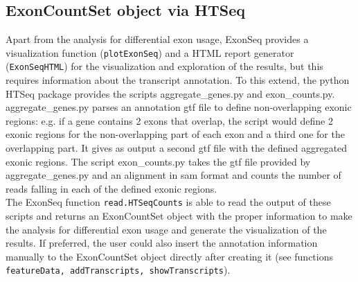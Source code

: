 \documentclass{article}
\begin{document}
\subsection{ExonCountSet object via HTSeq}
Apart from the analysis for differential exon usage, ExonSeq provides a visualization function (\texttt{plotExonSeq}) and a HTML report generator (\texttt{ExonSeqHTML}) for the visualization and exploration of the results, but this requires information about the transcript annotation.  To this extend, the python HTSeq package provides the scripts aggregate\_genes.py and exon\_counts.py.  aggregate\_genes.py parses an annotation gtf file to define non-overlapping exonic regions: e.g. if a gene contains 2 exons that overlap, the script would define 2 exonic regions for the non-overlapping part of each exon and a third one for the overlapping part. It gives as output a second gtf file with the defined aggregated exonic regions.  The script exon\_counts.py takes the gtf file provided by aggregate\_genes.py and an alignment in sam format and counts the number of reads falling in each of the defined exonic regions. \\ The ExonSeq function \texttt{read.HTSeqCounts} is able to read the output of these scripts and returns an ExonCountSet object with the proper information to make the analysis for differential exon usage and generate the visualization of the results. If preferred, the user could also insert the annotation information manually to the ExonCountSet object directly after creating it (see functions \texttt{featureData, addTranscripts, showTranscripts}).
\end{document}
